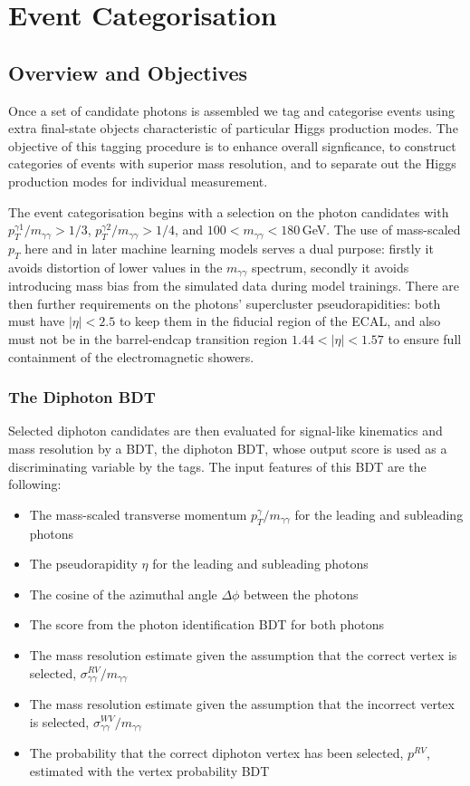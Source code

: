 \chapter{Event Categorisation}
\label{chap:event_select}

\newpage
\section{Overview and Objectives}
Once a set of candidate photons is assembled we tag and categorise events using extra final-state objects characteristic of particular Higgs production modes.
The objective of this tagging procedure is to enhance overall signficance, to construct categories of events with superior mass resolution, and to separate out the Higgs production modes for individual measurement. 


The event categorisation begins with a selection on the photon candidates with $p_{T}^{\gamma1}/m_{\gamma\gamma} > 1/3$, $p_{T}^{\gamma2}/m_{\gamma\gamma} > 1/4$, and $100 < m_{\gamma\gamma} < 180$\,GeV.
The use of mass-scaled $p_{T}$ here and in later machine learning models serves a dual purpose: firstly it avoids distortion of lower values in the $m_{\gamma\gamma}$ spectrum, secondly it avoids introducing mass bias from the simulated data during model trainings. 
There are then further requirements on the photons' supercluster pseudorapidities: both must have $|\eta| < 2.5$ to keep them in the fiducial region of the ECAL, and also must not be in the barrel-endcap transition region $1.44 < |\eta| < 1.57$ to ensure full containment of the electromagnetic showers. 


\subsection{The Diphoton BDT}
Selected diphoton candidates are then evaluated for signal-like kinematics and mass resolution by a BDT, the diphoton BDT, whose output score is used as a discriminating variable by the tags.
The input features of this BDT are the following:
\begin{itemize}[leftmargin=.5in,noitemsep]
    \item The mass-scaled transverse momentum $p^{\gamma}_{T}/m_{\gamma\gamma}$ for the leading and subleading photons
    \item The pseudorapidity $\eta$ for the leading and subleading photons
    \item The cosine of the azimuthal angle $\Delta\phi$ between the photons
    \item The score from the photon identification BDT for both photons
    \item The mass resolution estimate given the assumption that the correct vertex is selected, $\sigma^{RV}_{\gamma\gamma}/m_{\gamma\gamma}$
    \item The mass resolution estimate given the assumption that the incorrect vertex is selected, $\sigma^{WV}_{\gamma\gamma}/m_{\gamma\gamma}$
    \item The probability that the correct diphoton vertex has been selected, $p^{RV}$, estimated with the vertex probability BDT
\end{itemize}

